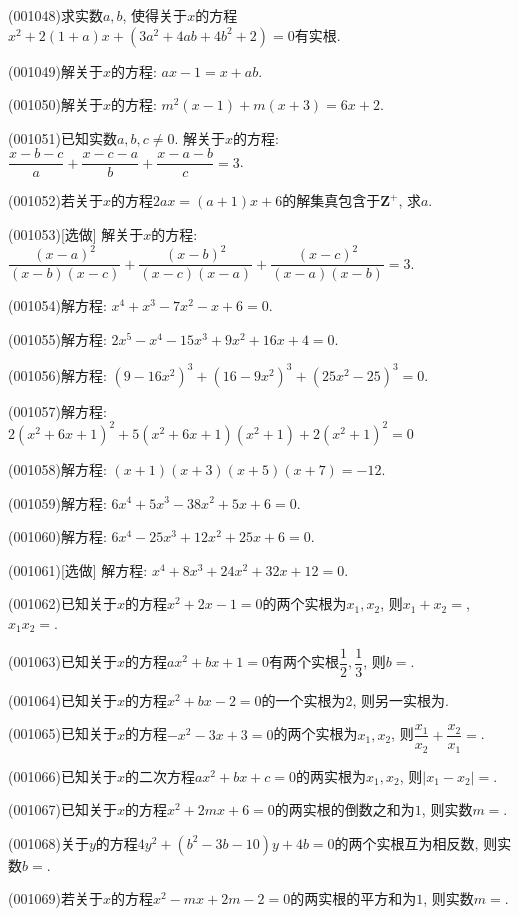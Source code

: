 \item (001048)求实数$a,b$, 使得关于$x$的方程$x^2+2(1+a)x+(3a^2+4ab+4b^2+2)=0$有实根.
\item (001049)解关于$x$的方程: $ax-1=x+ab$.
\item (001050)解关于$x$的方程: $m^2(x-1)+m(x+3)=6x+2$.
\item (001051)已知实数$a,b,c \ne 0$. 解关于$x$的方程: $\dfrac{x-b-c}{a}+\dfrac{x-c-a}{b}+\dfrac{x-a-b}{c}=3$.
\item (001052)若关于$x$的方程$2ax=(a+1)x+6$的解集真包含于$\mathbf{Z}^+$, 求$a$.
\item (001053)[选做]
解关于$x$的方程: $\dfrac{(x-a)^2}{(x-b)(x-c)}+\dfrac{(x-b)^2}{(x-c)(x-a)}+\dfrac{(x-c)^2}{(x-a)(x-b)}=3$.
\item (001054)解方程: $x^4+x^3-7x^2-x+6=0$.
\item (001055)解方程: $2x^5-x^4-15x^3+9x^2+16x+4=0$.
\item (001056)解方程: $(9-16x^2)^3+(16-9x^2)^3+(25x^2-25)^3=0$.
\item (001057)解方程: $2(x^2+6x+1)^2+5(x^2+6x+1)(x^2+1)+2(x^2+1)^2=0$
\item (001058)解方程: $(x+1)(x+3)(x+5)(x+7)=-12$.
\item (001059)解方程: $6x^4+5x^3-38x^2+5x+6=0$.
\item (001060)解方程: $6x^4-25x^3+12x^2+25x+6=0$.
\item (001061)[选做]
解方程: $x^4+8x^3+24x^2+32x+12=0$.
\item (001062)已知关于$x$的方程$x^2+2x-1=0$的两个实根为$x_1,x_2$, 则$x_1+x_2=$, $x_1x_2=$.
\item (001063)已知关于$x$的方程$ax^2+bx+1=0$有两个实根$\dfrac{1}{2}, \dfrac{1}{3}$, 则$b=$.
\item (001064)已知关于$x$的方程$x^2+bx-2=0$的一个实根为$2$, 则另一实根为.
\item (001065)已知关于$x$的方程$-x^2-3x+3=0$的两个实根为$x_1,x_2$, 则$\dfrac{x_1}{x_2}+\dfrac{x_2}{x_1}=$.
\item (001066)已知关于$x$的二次方程$ax^2+bx+c=0$的两实根为$x_1,x_2$, 则$|x_1-x_2|=$.
\item (001067)已知关于$x$的方程$x^2+2mx+6=0$的两实根的倒数之和为$1$, 则实数$m=$.
\item (001068)关于$y$的方程$4y^2+(b^2-3b-10)y+4b=0$的两个实根互为相反数, 则实数$b=$.
\item (001069)若关于$x$的方程$x^2-mx+2m-2=0$的两实根的平方和为$1$, 则实数$m=$.
